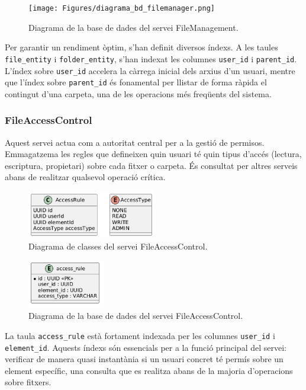 \begin{figure}[H]
    \centering
    \texttt{[image: Figures/diagrama\_bd\_filemanager.png]}
    \caption{Diagrama de la base de dades del servei FileManagement.}
    \label{fig:filemgmt_db}
\end{figure}

Per garantir un rendiment òptim, s'han definit diversos índexs. A les taules \texttt{file\_entity} i \texttt{folder\_entity}, s'han indexat les columnes \texttt{user\_id} i \texttt{parent\_id}. L'índex sobre \texttt{user\_id} accelera la càrrega inicial dels arxius d'un usuari, mentre que l'índex sobre \texttt{parent\_id} és fonamental per llistar de forma ràpida el contingut d'una carpeta, una de les operacions més freqüents del sistema.

\subsubsection{FileAccessControl}
Aquest servei actua com a autoritat central per a la gestió de permisos. Emmagatzema les regles que defineixen quin usuari té quin tipus d'accés (lectura, escriptura, propietari) sobre cada fitxer o carpeta. És consultat per altres serveis abans de realitzar qualsevol operació crítica.

\begin{figure}[H]
\centering
    \includegraphics[width=0.5\textwidth]{Figures/diagrama_clases_fileAccesControl.png}
    \caption{Diagrama de classes del servei FileAccessControl.}
    \label{fig:fac_classes}
\end{figure}

\begin{figure}[H]
\centering
    \includegraphics[width=0.3\textwidth]{Figures/diagrama_bd_fileAccesControl.png}
    \caption{Diagrama de la base de dades del servei FileAccessControl.}
    \label{fig:fac_db}
\end{figure}

La taula \texttt{access\_rule} està fortament indexada per les columnes \texttt{user\_id} i \texttt{element\_id}. Aquests índexs són essencials per a la funció principal del servei: verificar de manera quasi instantània si un usuari concret té permís sobre un element específic, una consulta que es realitza abans de la majoria d'operacions sobre fitxers.

